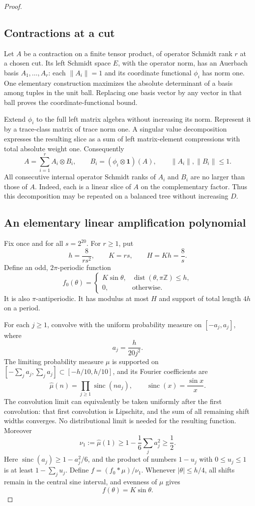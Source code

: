 \documentclass[11pt]{article}
\newcommand{\id}{\mathbf 1}
\begin{document}
\begin{proof}

\subsection{Contractions at a cut}

Let $A$ be a contraction on a finite tensor product, of operator Schmidt
rank $r$ at a chosen cut. Its left Schmidt space $E$, with the operator
norm, has an Auerbach basis $A_1,\ldots,A_r$: each $\|A_i\|=1$ and its
coordinate functional $\phi_i$ has norm one. One elementary construction
maximizes the absolute determinant of a basis among tuples in the unit
ball. Replacing one basis vector by any vector in that ball proves the
coordinate-functional bound.

Extend $\phi_i$ to the full left matrix algebra without increasing its
norm. Represent it by a trace-class matrix of trace norm one. A singular
value decomposition expresses the resulting slice as a sum of left
matrix-element compressions with total absolute weight one. Consequently
\[
 A=\sum_{i=1}^r A_i\otimes B_i,
 \qquad B_i=(\phi_i\otimes\id)(A),
 \qquad \|A_i\|,\|B_i\|\leq1.
\]
All consecutive internal operator Schmidt ranks of $A_i$ and $B_i$ are
no larger than those of $A$. Indeed, each is a linear slice of $A$ on
the complementary factor. Thus this decomposition may be repeated
on a balanced tree without increasing $D$.

\subsection{An elementary linear amplification polynomial}

Fix once and for all $s=2^{20}$. For $r\geq1$, put
\[
 h=\frac8{rs^2},\qquad K=rs,\qquad H=Kh=\frac8s.
\]
Define an odd, $2\pi$-periodic function
\[
 f_0(\theta)=
 \begin{cases}
 K\sin\theta,&\operatorname{dist}(\theta,\pi\mathbb Z)\leq h,\\
 0,&\text{otherwise}.
 \end{cases}
\]
It is also $\pi$-antiperiodic. It has modulus at most $H$ and support
of total length $4h$ on a period.

For each $j\geq1$, convolve with the uniform probability measure on
$[-a_j,a_j]$, where
\[
 a_j=\frac{h}{20j^2}.
\]
The limiting probability measure $\mu$ is supported on
$[-\sum_j a_j,\sum_j a_j]\subset[-h/10,h/10]$, and its Fourier
coefficients are
\[
 \widehat\mu(n)=\prod_{j\geq1}\operatorname{sinc}(na_j),
 \qquad \operatorname{sinc}(x)=\frac{\sin x}{x}.
\]
The convolution limit can equivalently be taken uniformly after the
first convolution: that first convolution is Lipschitz, and the sum
of all remaining shift widths converges. No distributional limit
is needed for the resulting function. Moreover
\[
 \nu_1:=\widehat\mu(1)\geq
 1-\frac16\sum_j a_j^2\geq\frac12.
\]
Here $\operatorname{sinc}(a_j)\geq1-a_j^2/6$, and the product of
numbers $1-u_j$ with $0\leq u_j\leq1$ is at least $1-\sum_j u_j$.
Define $f=(f_0*\mu)/\nu_1$. Whenever $|\theta|\leq h/4$, all shifts
remain in the central sine interval, and evenness of $\mu$ gives
\[
 f(\theta)=K\sin\theta.
\]


\end{proof}
\end{document}
